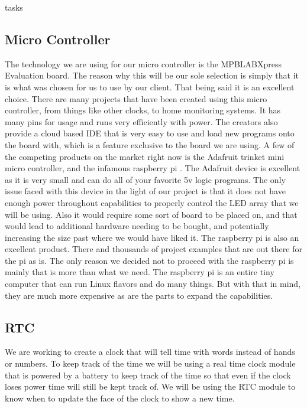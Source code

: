 tasks\documentclass[onecolumn, draftclsnofoot,10pt, compsoc]{IEEEtran}
\begin{document}
\subsection{Micro Controller}
The technology we are using for our micro controller is the MPBLABXpress Evaluation board.
The reason why this will be our sole selection is simply that it is what was chosen for us to use by our client.
That being said it is an excellent choice.
There are many projects that have been created using this micro controller, from things like other clocks, to home monitoring systems.
It has many pins for usage and runs very efficiently with power. The creators also provide a cloud based IDE \cite{cloudIDE} that is very easy to use and load new programs onto the board with, which is a feature exclusive to the board we are using.
A few of the competing products on the market right now is the Adafruit trinket \cite{trinket} mini micro controller, and the infamous raspberry pi \cite{pi}.
The Adafruit device is excellent as it is very small and can do all of your favorite 5v logic programs.
The only issue faced with this device in the light of our project is that it does not have enough power throughout capabilities to properly control the LED array that we will be using.
Also it would require some sort of board to be placed on, and that would lead to additional hardware needing to be bought, and potentially increasing the size past where we would have liked it.
The raspberry pi is also an excellent product. There and thousands of project examples that are out there for the pi as is.
The only reason we decided not to proceed with the raspberry pi is mainly that is more than what we need.
The raspberry pi is an entire tiny computer that can run Linux flavors and do many things.
But with that in mind, they are much more expensive as are the parts to expand the capabilities.

\subsection{RTC}
We are working to create a clock that will tell time with words instead of hands or numbers.
To keep track of the time we will be using a real time clock module that is powered by a battery to keep track of the time so that even if the clock loses power time will still be kept track of.
We will be using the RTC module to know when to update the face of the clock to show a new time.
\end{document}
